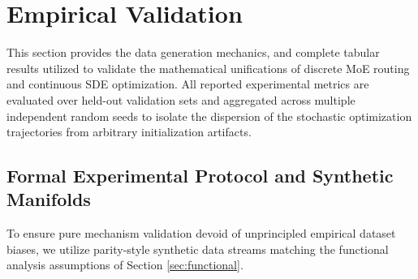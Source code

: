\documentclass{article}
\newcommand{\1}{\mathbb{I}}
\begin{document}
\section{Empirical Validation}
\label{app:experiments}

This section provides the data generation mechanics, and complete tabular results utilized to validate the mathematical unifications of discrete MoE routing and continuous SDE optimization. All reported experimental metrics are evaluated over held-out validation sets and aggregated across multiple independent random seeds to isolate the dispersion of the stochastic optimization trajectories from arbitrary initialization artifacts.

\subsection{Formal Experimental Protocol and Synthetic Manifolds}

To ensure pure mechanism validation devoid of unprincipled empirical dataset biases, we utilize parity-style synthetic data streams matching the functional analysis assumptions of Section \ref{sec:functional}.
\end{document}
